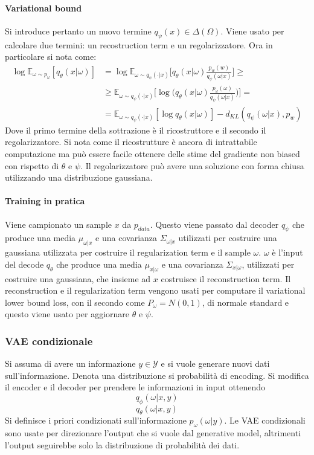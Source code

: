 			\paragraph{Variational bound}
			Si introduce pertanto un nuovo termine $q_\psi(x)\in\Delta(\Omega)$.
			Viene usato per calcolare due termini: un recostruction term e un regolarizzatore.
			Ora in particolare si nota come:
			\begin{align*}
				\log\mathbb{E}_{\omega\sim p_\omega} [q_\theta(x|\omega)] &= \log\mathbb{E}_{\omega\sim q_\psi(\cdot|x)}\bigl[q_\theta(x|\omega)\frac{p_w(w)}{q_\psi(\omega|x)}\bigr]\ge\\
																																	&\ge \mathbb{E}_{\omega\sim q_\psi(\cdot|x)}\bigl[\log\bigl(q_\theta(x|\omega)\frac{p_\omega(\omega)}{q_\psi(\omega|x)}\bigr)\bigr]=\\
																																	&=\mathbb{E}_{\omega\sim q_\psi(\cdot|x)}[\log q_\theta(x|\omega)] - d_{KL}(q_\psi(\omega|x), p_w)
			\end{align*}
			Dove il primo termine della sottrazione \`e il ricostruttore e il secondo il regolarizzatore.
			Si nota come il ricostrutture \`e ancora di intrattabile computazione ma pu\`o essere facile ottenere delle stime del gradiente non biased con rispetto di $\theta$ e $\psi$.
			Il regolarizzatore pu\`o avere una soluzione con forma chiusa utilizzando una distribuzione gaussiana.

			\paragraph{Training in pratica}
			Viene campionato un sample $x$ da $p_{data}$.
			Questo viene passato dal decoder $q_\psi$ che produce una media $\mu_{\omega|x}$ e una covarianza $\Sigma_{\omega|x}$ utilizzati per costruire una gaussiana utilizzata per costruire il regularization term e il sample $\omega$.
			$\omega$ \`e l'input del decode $q_\theta$ che produce una media $\mu_{x|\omega}$ e una covarianza $\Sigma_{x|\omega}$, utilizzati per costruire una gaussiana, che insieme ad $x$ costruisce il reconstruction term.
			Il reconstruction e il regularization term vengono usati per computare il variational lower bound loss, con il secondo come $P_\omega = N(0,1)$, di normale standard e questo viene usato per aggiornare $\theta$ e $\psi$.

		\subsubsection{VAE condizionale}
		Si assuma di avere un informazione $y\in\mathcal{Y}$ e si vuole generare nuovi dati sull'informazione.
		Denota una distribuzione si probabilit\`a di encoding.
		Si modifica il encoder e il decoder per prendere le informazioni in input ottenendo
		$$q_\phi(\omega|x,y)$$
		$$q_\theta(\omega|x,y)$$
		Si definisce i priori condizionati sull'informazione $p_\omega(\omega|y)$.
		Le VAE condizionali sono usate per direzionare l'output che si vuole dal generative model, altrimenti l'output seguirebbe solo la distribuzione di probabilit\`a dei dati.


